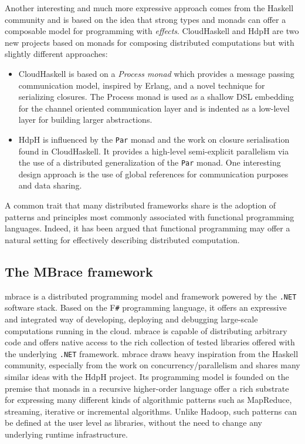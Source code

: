 \documentclass[9pt,a4paper]{article}
\newcommand{\mbrace}{mbrace}
\newcommand{\Mbrace}{\mbrace}
\newcommand{\TitularMbrace}{MBrace}
\newcommand{\fsharp}{F\texttt \#}
\newcommand{\dotnet}{\texttt{\hbox{.}NET}}
\begin{document}
Another interesting and much more expressive approach comes from the Haskell community and 
is based on the idea that strong types and monads can offer a composable model for
programming with \emph{effects}. CloudHaskell\cite{cloud-haskell} and HdpH\cite{HdpH} are 
two new projects based on monads for composing distributed computations but with slightly
different approaches:
%
\begin{itemize}
\item CloudHaskell is based on a \emph{Process monad} which provides a message passing 
communication model, inspired by Erlang, and a novel technique for serializing closures. 
The Process monad is used as a shallow DSL embedding for the channel oriented 
communication layer and is indented as a low-level layer for building larger 
abstractions.

\item HdpH is influenced by the \texttt{Par} monad\cite{par-monad} and the work on closure
serialisation found in CloudHaskell. It provides a high-level semi-explicit parallelism via 
the use of a distributed generalization of the \texttt{Par} monad. One interesting design
approach is the use of global references for communication purposes and data sharing.
\end{itemize}

A common trait that many distributed frameworks share is the adoption of patterns and
principles most commonly associated with functional programming languages. Indeed, 
it has been argued that functional programming may offer a natural setting for 
effectively describing distributed computation.

\subsection{The \TitularMbrace{} framework}

\Mbrace{} is a distributed programming model and framework powered by the \dotnet{}
software stack. Based on the \fsharp{} programming language, it offers an expressive
and integrated way of developing, deploying and debugging large-scale computations
running in the cloud. \Mbrace{} is capable of distributing arbitrary code and
offers native access to the rich collection of tested libraries offered with the
underlying \dotnet{} framework. \Mbrace{} draws heavy inspiration from the Haskell 
community, especially from the work on concurrency/parallelism and shares many similar
ideas with the HdpH project. Its programming model is founded on the premise that monads 
in a recursive higher-order language offer a rich substrate for expressing many
different kinds of algorithmic patterns such as MapReduce, streaming\cite{ShmStreaming},
iterative\cite{HaLoop} or incremental\cite{IncMR} algorithms. Unlike Hadoop, such 
patterns can be defined at the user level as libraries, without the need to change any
underlying runtime infrastructure.
\end{document}
